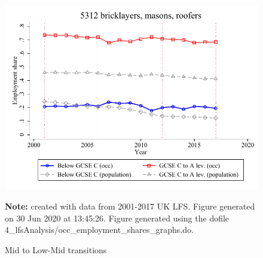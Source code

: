 \begin{figure}[!h]
\centering
\ContinuedFloat
\caption{Mid to Low-Mid transitions}
\includegraphics[width=1\textwidth]{../output/occ_transitions_5312_212}
\par \begin{minipage}[h]{\textwidth}{\scriptsize\textbf{Note:} created with data from 2001-2017 UK LFS. Figure generated on 30 Jun 2020 at 13:45:26. Figure generated using the dofile 4\_lfsAnalysis/occ\_employment\_shares\_graphs.do.}\end{minipage}
\end{figure}
